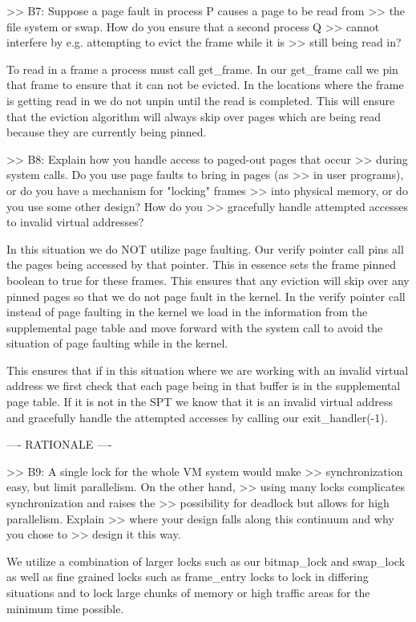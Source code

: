 >> B7: Suppose a page fault in process P causes a page to be read from
>> the file system or swap.  How do you ensure that a second process Q
>> cannot interfere by e.g. attempting to evict the frame while it is
>> still being read in?

To read in a frame a process must call get_frame. In our get_frame call
we pin that frame to ensure that it can not be evicted. In the locations
where the frame is getting read in we do not unpin until the read is
completed. This will ensure that the eviction algorithm will always
skip over pages which are being read because they are currently being
pinned. 

>> B8: Explain how you handle access to paged-out pages that occur
>> during system calls.  Do you use page faults to bring in pages (as
>> in user programs), or do you have a mechanism for "locking" frames
>> into physical memory, or do you use some other design?  How do you
>> gracefully handle attempted accesses to invalid virtual addresses?

In this situation we do NOT utilize page faulting. Our verify pointer call
pins all the pages being accessed by that pointer. This in essence sets the
frame pinned boolean to true for these frames. This ensures that any eviction
will skip over any pinned pages so that we do not page fault in the kernel.
In the verify pointer call instead of page faulting in the kernel we load 
in the information from the supplemental page table and move forward with 
the system call to avoid the situation of page faulting while in the
kernel. 

This ensures that if in this situation where we are working with an invalid
virtual address we first check that each page being in that buffer
is in the supplemental page  table. If it is not in the SPT we know 
that it is an invalid virtual address and gracefully handle the
attempted accesses by calling our exit_handler(-1). 


---- RATIONALE ----

>> B9: A single lock for the whole VM system would make
>> synchronization easy, but limit parallelism.  On the other hand,
>> using many locks complicates synchronization and raises the
>> possibility for deadlock but allows for high parallelism.  Explain
>> where your design falls along this continuum and why you chose to
>> design it this way.

We utilize a combination of larger locks such as our bitmap_lock and swap_lock
as well as fine grained locks such as frame_entry locks to lock in differing
situations and to lock large chunks of memory or high traffic areas 
for the minimum time possible. 

